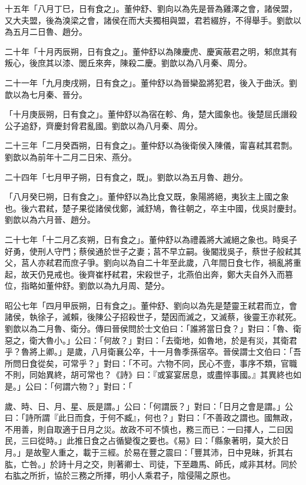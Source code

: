 \begin{pinyinscope}
十五年「八月丁巳，日有食之」。董仲舒、劉向以為先是晉為雞澤之會，諸侯盟，又大夫盟，後為溴梁之會，諸侯在而大夫獨相與盟，君若綴斿，不得舉手。劉歆以為五月二日魯、趙分。

二十年「十月丙辰朔，日有食之」。董仲舒以為陳慶虎、慶寅蔽君之明，邾庶其有叛心，後庶其以漆、閭丘來奔，陳殺二慶。劉歆以為八月秦、周分。

二十一年「九月庚戌朔，日有食之」。董仲舒以為晉欒盈將犯君，後入于曲沃。劉歆以為七月秦、晉分。

「十月庚辰朔，日有食之」。董仲舒以為宿在軫、角，楚大國象也。後楚屈氏譖殺公子追舒，齊慶封脅君亂國。劉歆以為八月秦、周分。

二十三年「二月癸酉朔，日有食之」。董仲舒以為後衛侯入陳儀，甯喜弒其君剽。劉歆以為前年十二月二日宋、燕分。

二十四年「七月甲子朔，日有食之，既」。劉歆以為五月魯、趙分。

「八月癸巳朔，日有食之」。董仲舒以為比食又既，象陽將絕，夷狄主上國之象也。後六君弒，楚子果從諸侯伐鄭，滅舒鳩，魯往朝之，卒主中國，伐吳討慶封。劉歆以為六月晉、趙分。

二十七年「十二月乙亥朔，日有食之」。董仲舒以為禮義將大滅絕之象也。時吳子好勇，使刑人守門；蔡侯通於世子之妻；莒不早立嗣。後閽戕吳子，蔡世子般弒其父，莒人亦弒君而庶子爭。劉向以為自二十年至此歲，八年間日食七作，禍亂將重起，故天仍見戒也。後齊崔杼弒君，宋殺世子，北燕伯出奔，鄭大夫自外入而篡位，指略如董仲舒。劉歆以為九月周、楚分。

昭公七年「四月甲辰朔，日有食之」。董仲舒、劉向以為先是楚靈王弒君而立，會諸侯，執徐子，滅賴，後陳公子招殺世子，楚因而滅之，又滅蔡，後靈王亦弒死。劉歆以為二月魯、衛分。傳曰晉侯問於士文伯曰：「誰將當日食？」對曰：「魯、衛惡之，衛大魯小。」公曰：「何故？」對曰：「去衛地，如魯地，於是有災，其衛君乎？魯將上卿。」是歲，八月衛襄公卒，十一月魯季孫宿卒。晉侯謂士文伯曰：「吾所問日食從矣，可常乎？」對曰：「不可。六物不同，民心不壹，事序不類，官職不則，同始異終，胡可常也？《詩》曰：『或宴宴居息，或盡悴事國。』其異終也如是。」公曰：「何謂六物？」對曰：「

歲、時、日、月、星、辰是謂。」公曰：「何謂辰？」對曰：「日月之會是謂。」公曰：「詩所謂『此日而食，于何不臧』，何也？」對曰：「不善政之謂也。國無政，不用善，則自取適于日月之災。故政不可不慎也，務三而已：一曰擇人，二曰因民，三曰從時。」此推日食之占循變復之要也。《易》曰：「縣象著明，莫大於日月。」是故聖人重之，載于三經。於易在豐之震曰：「豐其沛，日中見昧，折其右肱，亡咎。」於詩十月之交，則著卿士、司徒，下至趣馬、師氏，咸非其材。同於右肱之所折，協於三務之所擇，明小人乘君子，陰侵陽之原也。


\end{pinyinscope}
